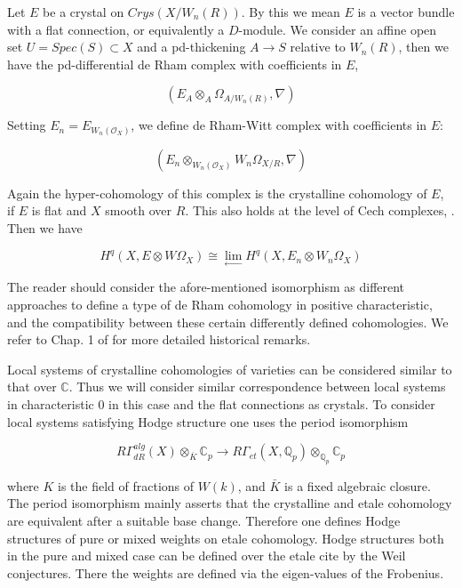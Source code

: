 \documentclass[12pt,twoside]{amsart}
\begin{document}
\vspace{0.5cm}

\noindent
Let $E$ be a crystal on $Crys(X/W_n(R))$. By this we mean $E$ is a vector bundle with a flat connection, or equivalently a $D$-module. We consider an affine open set $U=Spec(S) \subset X$ and a pd-thickening
$A \to S$ relative to $W_n(R)$, then we have the pd-differential de Rham complex with coefficients in $E$,

\[ (E_A \otimes_A \Omega_{A/W_n(R)},\nabla) \]

\vspace{0.5cm}

\noindent
Setting $E_n=E_{W_n(\mathcal{O}_X)}$, we define de Rham-Witt complex with coefficients in $E$:

\[ (E_n \otimes_{W_n(\mathcal{O}_X)}W_n\Omega_{X/R},\nabla) \]

\vspace{0.5cm}

\noindent
Again the hyper-cohomology of this complex is the crystalline cohomology of $E$, if $E$ is flat and $X$ smooth over $R$. This also holds at the level of Cech complexes, \cite{LZ}. Then we have 

\[ H^q(X, E \otimes W\Omega_X) \cong \lim_{\leftarrow}H^q(X, E_n \otimes W_n\Omega_X) \]

\vspace{0.5cm}

The reader should consider the afore-mentioned isomorphism as different approaches to define a type of de Rham cohomology in positive characteristic, and the compatibility between these certain differently defined cohomologies. We refer to Chap. 1 of \cite{BEO} for more detailed historical remarks. 

\vspace{0.5cm}

\noindent
Local systems of crystalline cohomologies of varieties can be considered similar to that over $\mathbb{C}$. Thus we will consider similar correspondence between local systems 
in characteristic $0$ in this case and the flat connections as crystals. To consider local systems satisfying Hodge structure one uses the period isomorphism 

\[ R\Gamma_{dR}^{alg}(X) \otimes_{\overline{K}}\mathbb{C}_p \rightarrow R\Gamma_{et}(X,\mathbb{Q}_p) \otimes_{\mathbb{Q}_p} \mathbb{C}_p \]

\vspace{0.5cm}

\noindent 
where $K$ is the field of fractions of $W(k)$, and $\bar{K}$ is a fixed algebraic closure. The period isomorphism mainly asserts that the crystalline and etale cohomology are equivalent after a suitable base change. Therefore one defines Hodge structures of pure or mixed weights on etale cohomology. Hodge structures both in the pure and mixed case can be defined over the etale cite by the Weil conjectures. There the weights are defined via the eigen-values of the Frobenius. 
\end{document}
